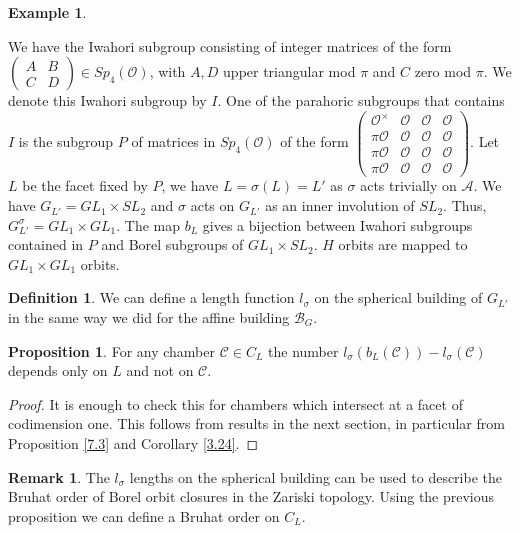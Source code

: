 \documentclass[12pt]{article}
\newcommand{\A}{\mathcal{A}}
\newcommand{\B}{\mathcal{B}}
\newcommand{\C}{\mathcal{C}}
\newcommand{\s}{\mathcal{O}}
\newcommand{\<}{\langle}
\renewcommand{\>}{\rangle}
\theoremstyle{plain}
\theoremstyle{definition}
\newtheorem{prop}[theorem]{Proposition}
\newtheorem{Remark}[theorem]{Remark}
\newtheorem{defn}[theorem]{Definition} %
\newtheorem{exmp}[theorem]{Example} %
\begin{document}
\begin{exmp}
\begin{enumerate}
        We have the Iwahori subgroup consisting of integer matrices of the form $\begin{pmatrix}
            A & B\\
            C& D
        \end{pmatrix}\in Sp_4(\s)$, with $A,D$ upper triangular mod $\pi$ and $C$ zero mod $\pi$. We denote this Iwahori subgroup by $I$. One of the parahoric subgroups that contains $I$ is the subgroup $P$ of matrices in $Sp_4(\s)$ of the form $\begin{pmatrix}
            \s^\times & \s &\s&\s\\
            \pi\s& \s & \s &\s \\
            \pi \s & \s & \s &\s \\
            \pi \s & \s & \s &\s
        \end{pmatrix}$. Let $L$ be the facet fixed by $P$, we have $L=\sigma(L)=L'$ as $\sigma$ acts trivially on $\A$. We have $G_{L'}=GL_1\times SL_2$ and $\sigma$ acts on $G_{L'}$ as an inner involution of $SL_2$. Thus, $G_{L'}^\sigma=GL_1\times GL_1$. The map $b_L$ gives a bijection between Iwahori subgroups contained in $P$ and Borel subgroups of $GL_1\times SL_2$. $H$ orbits are mapped to $GL_1\times GL_1$ orbits.
    \end{enumerate}
\end{exmp}


\begin{defn}
    We can define a length function $l_\sigma$ on the spherical building of $G_{L'}$ in the same way we did for the affine building $\B_G$.
\end{defn}

\begin{prop}
    For any chamber $\C\in C_L$ the number $l_\sigma(b_L(\C))-l_\sigma(\C)$ depends only on $L$ and not on $\C$.
\end{prop}

\begin{proof}
    It is enough to check this for chambers which intersect at a facet of codimension one. This follows from results in the next section, in particular from Proposition \ref{7.3} and Corollary \ref{3.24}.   
\end{proof}

\begin{Remark}
    The $l_\sigma$ lengths on the spherical building can be used to describe the Bruhat order of Borel orbit closures in the Zariski topology. Using the previous proposition we can define a Bruhat order on $C_L$.
\end{Remark}
\end{document}
